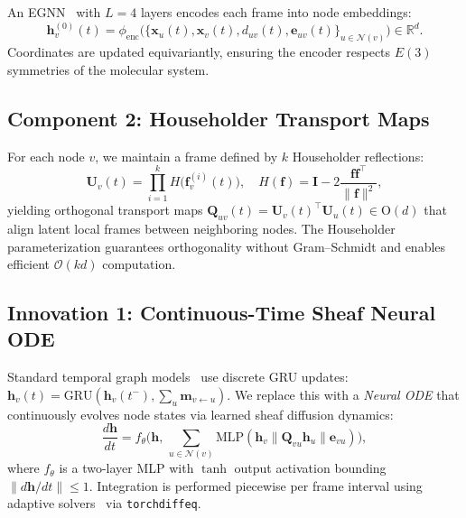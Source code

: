 \documentclass{article}
\begin{document}
An EGNN~\citep{satorras2021egnn} with $L{=}4$ layers encodes each
frame into node embeddings:
\begin{equation}
  \mathbf{h}_v^{(0)}(t)
  = \phi_\text{enc}\!\bigl(
    \{\mathbf{x}_u(t), \mathbf{x}_v(t), d_{uv}(t),
     \mathbf{e}_{uv}(t)\}_{u \in \mathcal{N}(v)}
  \bigr) \in \mathbb{R}^d.
  \label{eq:encoder}
\end{equation}
Coordinates are updated equivariantly, ensuring the encoder respects
$E(3)$ symmetries of the molecular system.

\subsection{Component 2: Householder Transport Maps}
\label{sec:householder}

For each node $v$, we maintain a frame defined by $k$ Householder
reflections:
\begin{equation}
  \mathbf{U}_v(t)
  = \prod_{i=1}^{k}
    H\!\bigl(\mathbf{f}^{(i)}_v(t)\bigr),
  \quad
  H(\mathbf{f}) = \mathbf{I} - 2\frac{\mathbf{f}\mathbf{f}^\top}
  {\|\mathbf{f}\|^2},
  \label{eq:householder}
\end{equation}
yielding orthogonal transport maps
$\mathbf{Q}_{uv}(t) = \mathbf{U}_v(t)^\top \mathbf{U}_u(t)
\in \mathrm{O}(d)$ that align latent local frames between neighboring
nodes.  The Householder parameterization guarantees orthogonality
without Gram--Schmidt and enables efficient $\mathcal{O}(kd)$
computation.

\subsection{Innovation 1: Continuous-Time Sheaf Neural ODE}
\label{sec:ode}

Standard temporal graph models~\citep{rossi2020temporal} use discrete
GRU updates:
$\mathbf{h}_v(t) = \text{GRU}(\mathbf{h}_v(t^-),
\sum_u \mathbf{m}_{v \leftarrow u})$.
We replace this with a \emph{Neural ODE} that continuously evolves
node states via learned sheaf diffusion dynamics:
\begin{equation}
  \frac{d\mathbf{h}}{dt}
  = f_\theta\!\bigl(\mathbf{h},\,
    \textstyle\sum_{u \in \mathcal{N}(v)}
    \text{MLP}(\mathbf{h}_v \| \mathbf{Q}_{vu}\mathbf{h}_u \|
    \mathbf{e}_{vu})\bigr),
  \label{eq:ode}
\end{equation}
where $f_\theta$ is a two-layer MLP with $\tanh$ output activation
bounding $\|d\mathbf{h}/dt\| \le 1$.  Integration is performed
piecewise per frame interval using adaptive
solvers~\citep{chen2018neural} via \texttt{torchdiffeq}.
\end{document}
